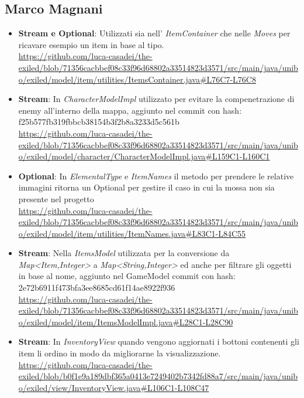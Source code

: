 \documentclass[a4paper,12pt]{report}
\begin{document}
\subsection{Marco Magnani}
\begin{itemize}
	\item \textbf{Stream e Optional}: Utilizzati sia nell' \textit{ItemContainer} che nelle \textit{Moves} per ricavare esempio un item in base al tipo.\\ \url{https://github.com/luca-casadei/the-exiled/blob/71356cacbbef08c33f96d68802a33514823d3571/src/main/java/unibo/exiled/model/item/utilities/ItemsContainer.java#L76C7-L76C8}
	\item \textbf{Stream}: In \textit{CharacterModelImpl} utilizzato per evitare la compenetrazione di enemy all'interno della mappa, aggiunto nel commit con hash: f25b577fb319fbbcb38154b3f2b8a3233d5c561b\\
	\url{https://github.com/luca-casadei/the-exiled/blob/71356cacbbef08c33f96d68802a33514823d3571/src/main/java/unibo/exiled/model/character/CharacterModelImpl.java#L159C1-L160C1} 
	\item \textbf{Optional}: In \textit{ElementalType} e \textit{ItemNames} il metodo per prendere le relative immagini ritorna un Optional per gestire il caso in cui la mossa non sia presente nel progetto\\
	\url{https://github.com/luca-casadei/the-exiled/blob/71356cacbbef08c33f96d68802a33514823d3571/src/main/java/unibo/exiled/model/item/utilities/ItemNames.java#L83C1-L84C55}
	\item \textbf{Stream}: Nella \textit{ItemsModel} utilizzata per la conversione da \textit{Map\textless Item,Integer\textgreater} a \textit{Map\textless String,Integer\textgreater} ed anche per filtrare gli oggetti in base al nome, aggiunto nel GameModel commit con hash: 2e72b6911f473bfa3ee8685cd61f14ae8922f936\\
	\url{https://github.com/luca-casadei/the-exiled/blob/71356cacbbef08c33f96d68802a33514823d3571/src/main/java/unibo/exiled/model/item/ItemsModelImpl.java#L28C1-L28C90}
	\item \textbf{Stream}: In \textit{InventoryView} quando vengono aggiornati i bottoni contenenti gli item li ordino in modo da migliorarne la visualizzazione.
	\url{https://github.com/luca-casadei/the-exiled/blob/b0f1e9a189dbf365a0413e7249402b7342fd88a7/src/main/java/unibo/exiled/view/InventoryView.java#L106C1-L108C47}
\end{itemize}
\end{document}
